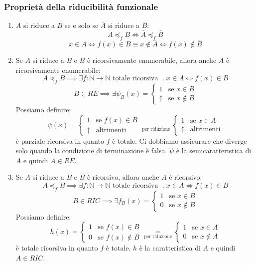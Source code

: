 \documentclass[a4paper]{article}
\begin{document}
\subsubsection{Proprietà della riducibilità funzionale}
\begin{enumerate}
  \item \( A \) si riduce a \( B \) se e solo se \( \bar{A} \) si riduce a \( \bar{B} \):
    \[
      A \preceq_f B \iff \bar{A} \preceq_f \bar{B}
    \]
    \[
      x \in A \iff f(x) \in B \equiv x \notin \bar{A} \iff f(x) \notin \bar{B}
    \] 

  \item Se \( A \) si riduce a \( B \) e \( B \) è ricorsivamente enumerabile,
    allora anche \( A \) è ricorsivamente enumerabile: 
    \[
      A \preceq_f B \implies \exists f: \mathbb{N} \to \mathbb{N} \text{ totale ricorsiva }
      \;.\; x \in A \iff f(x) \in B
    \] 
    \[
      B \in RE \implies \exists \psi_B(x) =
      \begin{cases}
        1 & \text{se } x \in B \\
        \uparrow & \text{se } x \notin B
      \end{cases}
    \] 
    Possiamo definire:
    \[
      \psi(x) =
      \begin{cases}
        1 & \text{se } f(x) \in B \\
        \uparrow & \text{altrimenti}
      \end{cases}
      \underset{\text{per riduzione}}{=}
      \begin{cases}
        1 & \text{se } x \in A \\
        \uparrow & \text{altrimenti}
      \end{cases}
    \] 
    è parziale ricorsiva in quanto \( f \) è totale. Ci dobbiamo assicurare che diverge solo
    quando la condizione di terminazione è falsa.
    \( \psi  \) è la semicaratteristica di \( A \) e quindi \( A \in RE \).

  \item Se \( A \) si riduce a \( B \) e \( B \) è ricorsivo,
    allora anche \( A \) è ricorsivo:
    \[
      A \preceq_f B \implies \exists f: \mathbb{N} \to \mathbb{N} \text{ totale ricorsiva }
      \;.\; x \in A \iff f(x) \in B
    \] 
    \[
      B \in RIC \implies \exists f_B(x) =
      \begin{cases}
        1 & \text{se } x \in B \\
        0 & \text{se } x \notin B
      \end{cases}
    \] 
    Possiamo definire:
    \[
      h(x) =
      \begin{cases}
        1 & \text{se } f(x) \in B \\
        0 & \text{se } f(x) \notin B
      \end{cases}
      \underset{\text{per riduzione}}{=}
      \begin{cases}
        1 & \text{se } x \in A \\
        0 & \text{se } x \notin A
      \end{cases}
    \] 
    è totale ricorsiva in quanto \( f \) è totale. \( h \) è la caratteristica di \( A \)
    e quindi \( A \in RIC \).
\end{enumerate}
\end{document}
